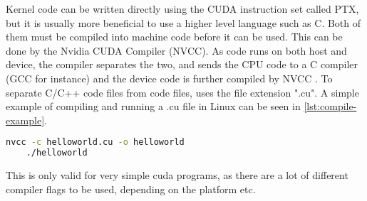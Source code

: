 Kernel code can be written directly using the CUDA instruction set called PTX, but it is usually more beneficial to use a higher level language such as C.
Both of them must be compiled into machine code before it can be used.
This can be done by the Nvidia CUDA Compiler (NVCC).
As \cuda{} code runs on both host and device, the compiler separates the two, and sends the CPU code to a C compiler (GCC for instance) and the device code is further compiled by NVCC \cite{cuda:programmingguide}.
To separate C/C++ code files from \cuda{} code files, \cuda{} uses the file extension ".cu".
A simple example of compiling and running a .cu file in Linux can be seen in \autoref{lst:compile-example}.
\begin{lstlisting}[language=bash,caption={Compilation and run example},label=lst:compile-example]
	nvcc -c helloworld.cu -o helloworld
	./helloworld 
\end{lstlisting}
This is only valid for very simple cuda programs, as there are a lot of different compiler flags to be used, depending on the platform etc.
